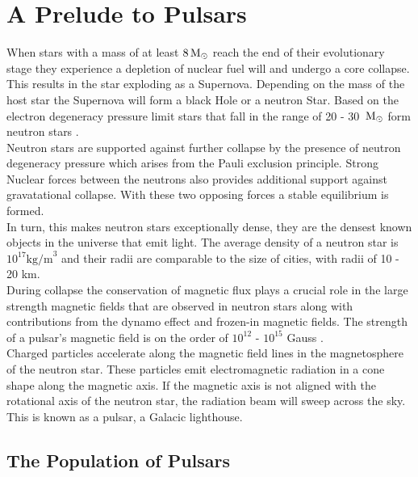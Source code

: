 \setcounter{page}{1} 
\section{A Prelude to Pulsars} \label{sec:prelude}
When stars with a mass of at least $8 \, \text{M}_\odot$ reach the end of their evolutionary stage they experience a depletion of nuclear fuel will and undergo a core collapse.  This results in the star exploding as a Supernova. Depending on the mass of the host star the Supernova will form a black Hole or a neutron Star. Based on the electron degeneracy pressure limit \citep[pp. 434 - 443]{chandrasekhar_introduction_2012} stars that fall in the range of 20 - 30 $\, \text{M}_\odot$ form neutron stars \citep{heger_how_2003}. \\

Neutron stars are supported against further collapse by the presence of neutron degeneracy pressure which arises from the Pauli exclusion principle. Strong Nuclear forces between the neutrons also provides additional support against gravatational collapse. With these two opposing forces a stable equilibrium is formed. \\ 

In turn, this makes neutron stars exceptionally dense, they are the densest known objects in the universe that emit light. The average density of a neutron star is $10^{17} \text{kg/m}^3$ \citep{baym_neutron_1971} and their radii are comparable to the size of cities, with radii of 10 - 20 km. \\

During collapse the conservation of magnetic flux plays a crucial role in the large strength magnetic fields that are observed in neutron stars along with contributions from the dynamo effect and frozen-in magnetic fields. The strength of a pulsar's magnetic field is on the order of $10^{12}$ - $10^{15}$ Gauss \citep{michel_theory_1982}. \\

Charged particles accelerate along the magnetic field lines in the magnetosphere of the neutron star. These particles emit electromagnetic radiation in a cone shape along the magnetic axis. If the magnetic axis is not aligned with the rotational axis of the neutron star, the radiation beam will sweep across the sky. This is known as a pulsar, a Galacic lighthouse.%

\subsection{The Population of Pulsars}

